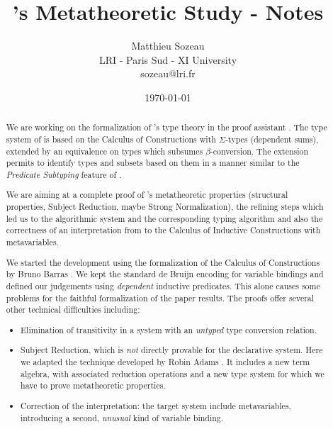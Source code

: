 \documentclass[11pt]{article}
\title{\Russell's Metatheoretic Study - Notes}
\date{\today}
\author{Matthieu Sozeau \\
  LRI - Paris Sud - XI University \\
  sozeau@lri.fr}
\begin{document}
\maketitle
\begin{abstract}

We are working on the formalization of \Russell{}'s type theory in the
\Coq{} proof assistant \cite{sozeau:coq/Russell/meta}.  The type system
of \Russell{} is based on the Calculus of Constructions with
$\Sigma$-types (dependent sums), extended by an equivalence on types
which subsumes $\beta$-conversion. The extension permits to identify
types and subsets based on them in a manner similar to the
\emph{Predicate Subtyping} feature of \PVS{}.

We are aiming at a complete proof of \Russell{}'s metatheoretic properties
(structural properties, Subject Reduction, maybe Strong Normalization),
the refining steps which led us to the algorithmic system and the
corresponding typing algorithm and also the correctness of an interpretation
from \Russell{} to the Calculus of Inductive Constructions with
metavariables.

We started the development using the formalization of the Calculus of
Constructions by Bruno Barras \cite{Barras96a}.  We kept the standard de
Bruijn encoding for variable bindings and defined our judgements using
\emph{dependent} inductive predicates.  This alone causes some problems
for the faithful formalization of the paper results.  The proofs offer
several other technical difficulties including:
\begin{itemize}
\item Elimination of transitivity in a system with an \emph{untyped} type
  conversion relation.

\item Subject Reduction, which is \emph{not} directly provable for the
  declarative system. Here we adapted the technique developed by
  Robin Adams \cite{adams:PTSEQ}. It includes a new term algebra, with
  associated reduction operations and a new type system
  for which we have to prove metatheoretic properties.

\item Correction of the interpretation: the target system include
  metavariables, introducing a second, \emph{unusual} kind of variable binding.
\end{itemize}

\end{abstract}

\end{document}
